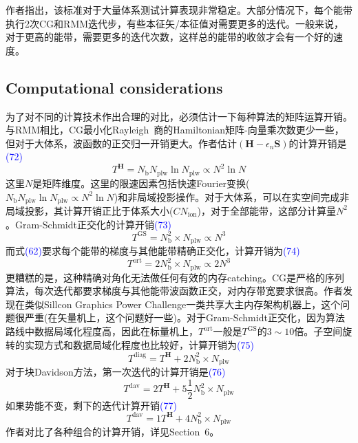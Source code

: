 \documentclass[14pt]{article}      %
\begin{document}
作者指出，该标准对于大量体系测试计算表现非常稳定。大部分情况下，每个能带执行\textrm{2}次\textrm{CG}和\textrm{RMM}迭代步，有些本征矢/本征值对需要更多的迭代。一般来说，对于更高的能带，需要更多的迭代次数，这样总的能带的收敛才会有一个好的速度。

\subsection{Computational considerations}
为了对不同的计算技术作出合理的对比，必须估计一下每种算法的矩阵运算开销。与\textrm{RMM}相比，\textrm{CG}最小化\textrm{Rayleigh~}商的\textrm{Hamiltonian}矩阵-向量乘次数更少一些，但对于大体系，波函数的正交归一开销更大。作者估计$(\mathbf{H}-\epsilon_n\mathbf{S})$的计算开销是\textcolor{blue}{(72)}
\begin{displaymath}
	T^{\mathbf{H}}=N_{\mathrm{b}}N_{\mathrm{plw}}\ln N_{\mathrm{plw}}\propto N^2\ln N
\end{displaymath}
这里$N$是矩阵维度。这里的限速因素包括快速\textrm{Fourier}变换($N_{\mathrm{b}}N_{\mathrm{plw}}\ln N_{\mathrm{plw}}\propto N^2\ln N$)和非局域投影操作。对于大体系，可以在实空间完成非局域投影，其计算开销正比于体系大小($CN_{\mathrm{ion}}$)，对于全部能带，这部分计算量$N^2$。\textrm{Gram-Schmidt}正交化的计算开销\textcolor{blue}{(73)}
\begin{displaymath}
	T^{\mathrm{GS}}=N_{\mathrm{b}}^2\times N_{\mathrm{plw}}\propto N^3
\end{displaymath}
而式\textcolor{blue}{(62)}要求每个能带的梯度与其他能带精确正交化，计算开销为\textcolor{blue}{(74)}
\begin{displaymath}
	T^{\mathrm{ort}}=2N_{\mathrm{b}}^2\times N_{\mathrm{plw}}\propto 2N^3
\end{displaymath}
更糟糕的是，这种精确对角化无法做任何有效的内存\textrm{catching}。\textrm{CG}是严格的序列算法，每次迭代都要求梯度与其他能带波函数正交，对内存带宽要求很高。作者发现在类似\textrm{Sillcon Graphics Power Challenge}一类共享大主内存架构机器上，这个问题很严重(在矢量机上，这个问题好一些)。对于\textrm{Gram-Schmidt}正交化，因为算法路线中数据局域化程度高，因此在标量机上，$T^{\mathrm{ort}}$一般是$T^{\mathrm{GS}}$的$3\sim10$倍。子空间旋转的实现方式和数据局域化程度也比较好，计算开销为\textcolor{blue}{(75)}
\begin{displaymath}
	T^{\mathrm{diag}}=T^{\mathbf{H}}+2N_{\mathrm{b}}^2\times N_{\mathrm{plw}}
\end{displaymath}
对于块\textrm{Davidson}方法，第一次迭代的计算开销是\textcolor{blue}{(76)}
\begin{displaymath}
	T^{\mathrm{dav}}=2T^{\mathbf{H}}+5\frac12N_{\mathrm{b}}^2\times N_{\mathrm{plw}}
\end{displaymath}
如果势能不变，剩下的迭代计算开销\textcolor{blue}{(77)}
\begin{displaymath}
	T^{\mathrm{dav}}=1T^{\mathbf{H}}+4N_{\mathrm{b}}^2\times N_{\mathrm{plw}}
\end{displaymath}
作者对比了各种组合的计算开销，详见\textrm{Section~6}。
\end{document}
